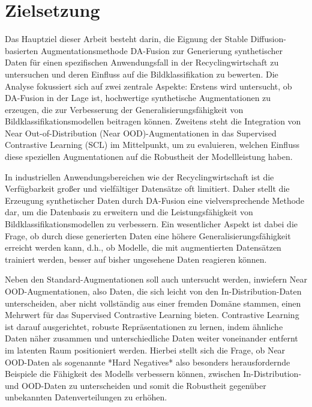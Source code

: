 
\section{Zielsetzung} \label{sec:goal}

Das Hauptziel dieser Arbeit besteht darin, die Eignung der Stable Diffusion-basierten Augmentationsmethode DA-Fusion zur Generierung synthetischer Daten für einen spezifischen Anwendungsfall in der Recyclingwirtschaft zu untersuchen und deren Einfluss auf die Bildklassifikation zu bewerten. Die Analyse fokussiert sich auf zwei zentrale Aspekte: Erstens wird untersucht, ob DA-Fusion in der Lage ist, hochwertige synthetische Augmentationen zu erzeugen, die zur Verbesserung der Generalisierungsfähigkeit von Bildklassifikationsmodellen beitragen können. Zweitens steht die Integration von Near Out-of-Distribution (Near OOD)-Augmentationen in das Supervised Contrastive Learning (SCL) im Mittelpunkt, um zu evaluieren, welchen Einfluss diese speziellen Augmentationen auf die Robustheit der Modellleistung haben.

In industriellen Anwendungsbereichen wie der Recyclingwirtschaft ist die Verfügbarkeit großer und vielfältiger Datensätze oft limitiert. Daher stellt die Erzeugung synthetischer Daten durch DA-Fusion eine vielversprechende Methode dar, um die Datenbasis zu erweitern und die Leistungsfähigkeit von Bildklassifikationsmodellen zu verbessern. Ein wesentlicher Aspekt ist dabei die Frage, ob durch diese generierten Daten eine höhere Generalisierungsfähigkeit erreicht werden kann, d.h., ob Modelle, die mit augmentierten Datensätzen trainiert werden, besser auf bisher ungesehene Daten reagieren können.

Neben den Standard-Augmentationen soll auch untersucht werden, inwiefern Near OOD-Augmentationen, also Daten, die sich leicht von den In-Distribution-Daten unterscheiden, aber nicht vollständig aus einer fremden Domäne stammen, einen Mehrwert für das Supervised Contrastive Learning bieten. Contrastive Learning ist darauf ausgerichtet, robuste Repräsentationen zu lernen, indem ähnliche Daten näher zusammen und unterschiedliche Daten weiter voneinander entfernt im latenten Raum positioniert werden. Hierbei stellt sich die Frage, ob Near OOD-Daten als sogenannte *Hard Negatives* \textemdash also besonders herausfordernde Beispiele \textemdash die Fähigkeit des Modells verbessern können, zwischen In-Distribution- und OOD-Daten zu unterscheiden und somit die Robustheit gegenüber unbekannten Datenverteilungen zu erhöhen.

